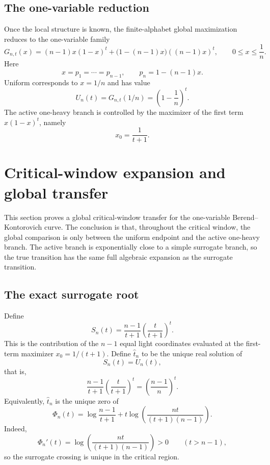 \documentclass[11pt]{article}
\theoremstyle{definition}
\begin{document}
\subsection{The one-variable reduction}

Once the local structure is known, the finite-alphabet global maximization reduces to the one-variable family
\[
  G_{n,t}(x)=(n-1)x(1-x)^t+\bigl(1-(n-1)x\bigr)((n-1)x)^t,
  \qquad 0\le x\le \frac1n.
\]
Here
\[
  x=p_1=\cdots=p_{n-1},\qquad p_n=1-(n-1)x.
\]
Uniform corresponds to $x=1/n$ and has value
\[
  U_n(t)=G_{n,t}(1/n)=\left(1-\frac1n\right)^t.
\]
The active one-heavy branch is controlled by the maximizer of the first term $x(1-x)^t$, namely
\[
  x_0=\frac1{t+1}.
\]

\section{Critical-window expansion and global transfer}

This section proves a global critical-window transfer for the one-variable Berend--Kontorovich curve. The conclusion is that, throughout the critical window, the global comparison is only between the uniform endpoint and the active one-heavy branch. The active branch is exponentially close to a simple surrogate branch, so the true transition has the same full algebraic expansion as the surrogate transition.

\subsection{The exact surrogate root}

Define
\[
  S_n(t)=\frac{n-1}{t+1}\left(\frac{t}{t+1}\right)^t.
\]
This is the contribution of the $n-1$ equal light coordinates evaluated at the first-term maximizer $x_0=1/(t+1)$. Define $\widehat t_n$ to be the unique real solution of
\begin{equation}\label{eq:surrogate-root}
  S_n(t)=U_n(t),
\end{equation}
that is,
\begin{equation}\label{eq:surrogate-explicit}
  \frac{n-1}{t+1}\left(\frac{t}{t+1}\right)^t
  =\left(\frac{n-1}{n}\right)^t.
\end{equation}
Equivalently, $\widehat t_n$ is the unique zero of
\begin{equation}\label{eq:Phi}
  \Phi_n(t)=\log\frac{n-1}{t+1}
   +t\log\left(\frac{nt}{(t+1)(n-1)}\right).
\end{equation}
Indeed,
\[
  \Phi_n'(t)=\log\left(\frac{nt}{(t+1)(n-1)}\right)>0\qquad(t>n-1),
\]
so the surrogate crossing is unique in the critical region.
\end{document}
